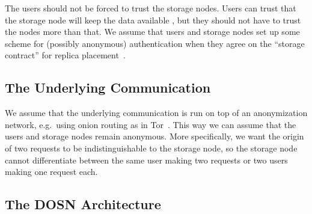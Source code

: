 
The users should not be forced to trust the storage nodes.
Users can trust that the storage node will keep the data available 
\cite{DataAvailability,ReplicaPlacement}, but they should not have to trust the 
nodes more than that.
We assume that users and storage nodes set up some scheme for (possibly 
anonymous) authentication when they agree on the \enquote{storage contract} for 
replica placement~\cite{ReplicaPlacement}.

\subsection<article>{The Underlying Communication}\label{sec:CommModel}

We assume that the underlying communication is run on top of an anonymization 
network, e.g.\ using onion routing as in Tor~\cite{Tor}.
This way we can assume that the users and storage nodes remain anonymous.
More specifically, we want the origin of two requests to be
indistinguishable to the storage node, so the storage node cannot differentiate 
between the same user making two requests or two users making one request each.

\subsection{The \acs{DOSN} Architecture}\label{sec:DOSN}

